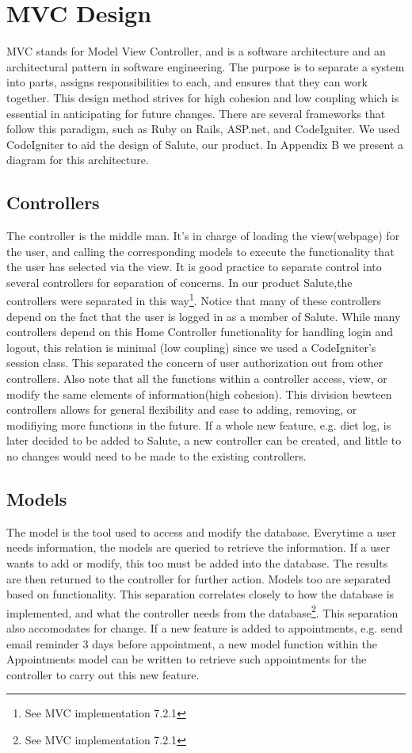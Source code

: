 \documentclass[12pt]{report}
\begin{document}
\section{MVC Design}

MVC stands for Model View Controller, and is a software architecture and an architectural pattern in software engineering. The purpose is to separate a system into parts, assigns responsibilities to each, and ensures that they can work together. This design method strives for high cohesion and low coupling which is essential in anticipating for future changes. There are several frameworks that follow this paradigm, such as Ruby on Rails, ASP.net, and CodeIgniter. We used CodeIgniter to aid the design of Salute, our product.  In Appendix B we present a diagram for this architecture.


\subsection{Controllers}

The controller is the middle man. It's in charge of loading the view(webpage) for the user, and calling the corresponding models to execute the functionality that the user has selected via the view. 
It is good practice to separate control into several controllers for separation of concerns. In our product Salute,the controllers were separated in this way\footnote{See MVC implementation 7.2.1}. Notice that many of these controllers depend on the fact that the user is logged in as a member of Salute. While many controllers depend on this Home Controller functionality for handling login and logout, this relation is minimal (low coupling) since we used a CodeIgniter's session class. This separated the concern of user authorization out from other controllers. 
Also note that all the functions within a controller access, view, or modify the same elements of information(high cohesion). This division bewteen controllers allows for general flexibility and ease to adding, removing, or modifiying more functions in the future. If a whole new feature, e.g. diet log, is later decided to be added to Salute, a new controller can be created, and little to no changes would need to be made to the existing controllers. 
\subsection{Models}
The model is the tool used to access and modify the database. Everytime a user needs information, the models are queried to retrieve the information. If a user wants to add or modify, this too must be added into the database. The results are then returned to the controller for further action.
Models too are separated based on functionality. This separation correlates closely to how the database is implemented, and what the controller needs from the database\footnote{See MVC implementation 7.2.1}. This separation also accomodates for change. If a new feature is added to appointments, e.g. send email reminder 3 days before appointment, a new model function within the Appointments model can be written to retrieve such appointments for the controller to carry out this new feature. 
\end{document}
